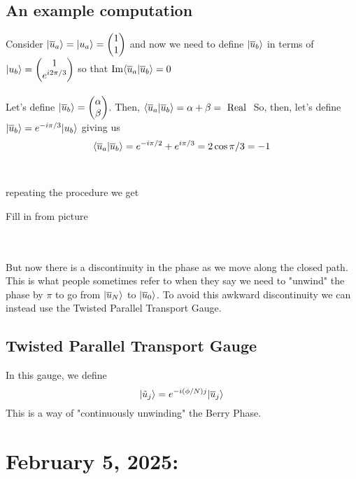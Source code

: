 \documentclass[11pt]{article}
\begin{document}
\subsection*{An example computation}
Consider $ \lvert\overline{u}_a\rangle = \lvert u_a\rangle = \begin{pmatrix}
  1 \\ 1
\end{pmatrix} $ and now we need to define $\lvert\overline{u}_b\rangle$ in terms of $\lvert u_b\rangle = \begin{pmatrix}
1 \\ e^{i2\pi/3}
\end{pmatrix}$ so that $\mathrm{Im}\langle \overline{u}_a | \overline{u}_b \rangle = 0$ 
\\
\\
Let's define $\lvert\overline{u}_b\rangle = \begin{pmatrix}
  \alpha \\ \beta
\end{pmatrix}$. Then, $\langle \overline{u}_a | \overline{u}_b \rangle = \alpha + \beta = \text{ Real }$ So, then, let's define $\lvert\overline{u}_b\rangle = e^{-i\pi/3} \lvert u_b\rangle$ giving us $$ \langle \overline{u}_a | \overline{u}_b \rangle = e^{-i\pi/2} + e^{i\pi/3} = 2\cos\pi/3 = -1$$
\\
\\
repeating the procedure we get \begin{note}
  {Fill in from picture}
\end{note} 
\\
\\
But now there is a discontinuity in the phase as we move along the closed path. This is what people sometimes refer to when they say we need to "unwind" the phase by $\pi$ to go from $\lvert\overline{u}_N\rangle$ to $\lvert\overline{u}_0\rangle$. To avoid this awkward discontinuity we can instead use the Twisted Parallel Transport Gauge.

\vskip 1cm
\subsection{Twisted Parallel Transport Gauge}
In this gauge, we define $$ \lvert\tilde{u}_j\rangle = e^{-i(\phi/N)j} \lvert\overline{u}_j\rangle $$ This is a way of "continuously unwinding" the Berry Phase.


\pagebreak
\section{February 5, 2025:}
\end{document}
